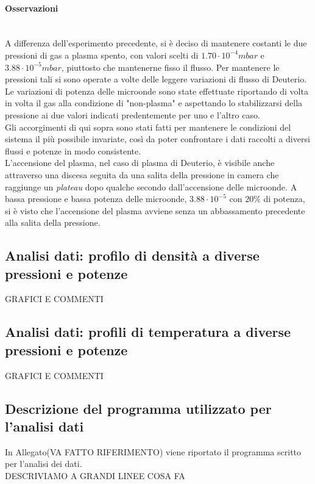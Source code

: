 \paragraph{Osservazioni} ~\\
A differenza dell'esperimento precedente, si è deciso di mantenere costanti le due pressioni di gas a plasma spento, con valori scelti di $1.70\cdot10^{-4}mbar$ e $3.88\cdot10^{-5}mbar$,
piuttosto che mantenerne fisso il flusso. 
Per mantenere le pressioni tali si sono operate a volte delle leggere variazioni di flusso di Deuterio.\\
Le variazioni di potenza delle microonde sono state effettuate riportando di volta in volta il gas alla condizione di "non-plasma" e aspettando lo stabilizzarsi della pressione ai due valori
indicati predentemente per uno e l'altro caso.\\
Gli accorgimenti di qui sopra sono stati fatti per mantenere le condizioni del sistema il più possibile invariate, così da poter confrontare i dati raccolti a diversi flussi e potenze in modo consistente.\\
L'accensione del plasma, nel caso di plasma di Deuterio, è visibile anche attraverso una discesa seguita da una salita della pressione in camera che raggiunge un \textit{plateau} dopo qualche secondo dall'accensione delle microonde.
A bassa pressione e bassa potenza delle microonde, $3.88\cdot10^{-5}$ con $20\%$ di potenza, si è visto che l'accensione del plasma avviene senza un abbassamento precedente alla salita della pressione.

\subsection{Analisi dati: profilo di densità a diverse pressioni e potenze}

GRAFICI E COMMENTI
\subsection{Analisi dati: profili di temperatura a diverse pressioni e potenze}

GRAFICI E COMMENTI

\subsection{Descrizione del programma utilizzato per l'analisi dati}
In Allegato(VA FATTO RIFERIMENTO) viene riportato il programma scritto per l'analisi dei dati.\\
DESCRIVIAMO A GRANDI LINEE COSA FA


